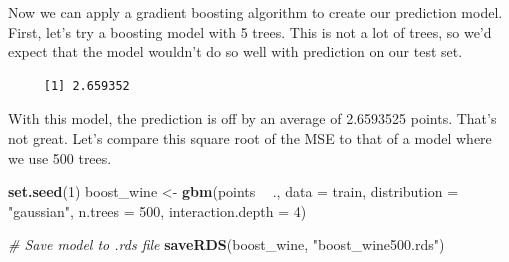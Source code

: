 \documentclass[12pt,twoside]{amherstthesis}
\newenvironment{Shaded}{\begin{snugshade}}{\end{snugshade}}
\newcommand{\KeywordTok}[1]{\textcolor[rgb]{0.13,0.29,0.53}{\textbf{#1}}}
\newcommand{\DataTypeTok}[1]{\textcolor[rgb]{0.13,0.29,0.53}{#1}}
\newcommand{\DecValTok}[1]{\textcolor[rgb]{0.00,0.00,0.81}{#1}}
\newcommand{\StringTok}[1]{\textcolor[rgb]{0.31,0.60,0.02}{#1}}
\newcommand{\CommentTok}[1]{\textcolor[rgb]{0.56,0.35,0.01}{\textit{#1}}}
\newcommand{\OtherTok}[1]{\textcolor[rgb]{0.56,0.35,0.01}{#1}}
\newcommand{\OperatorTok}[1]{\textcolor[rgb]{0.81,0.36,0.00}{\textbf{#1}}}
\newcommand{\NormalTok}[1]{#1}
\begin{document}
Now we can apply a gradient boosting algorithm to create our prediction
model. First, let's try a boosting model with 5 trees. This is not a lot
of trees, so we'd expect that the model wouldn't do so well with
prediction on our test set.
\begin{Shaded}
\end{Shaded}
\begin{verbatim}
     [1] 2.659352
\end{verbatim}
With this model, the prediction is off by an average of 2.6593525
points. That's not great. Let's compare this square root of the MSE to
that of a model where we use 500 trees.
\begin{Shaded}
\begin{Highlighting}[]
\KeywordTok{set.seed}\NormalTok{(}\DecValTok{1}\NormalTok{)}
\NormalTok{boost_wine <-}\StringTok{ }\KeywordTok{gbm}\NormalTok{(points }\OperatorTok{~}\StringTok{ }\NormalTok{., }
                   \DataTypeTok{data =}\NormalTok{ train, }
                   \DataTypeTok{distribution =} \StringTok{"gaussian"}\NormalTok{, }
                   \DataTypeTok{n.trees =} \DecValTok{500}\NormalTok{,}
                   \DataTypeTok{interaction.depth =} \DecValTok{4}\NormalTok{)}

\CommentTok{# Save model to .rds file}
\KeywordTok{saveRDS}\NormalTok{(boost_wine, }\StringTok{"boost_wine500.rds"}\NormalTok{)}
\end{Highlighting}
\end{Shaded}
\end{document}
